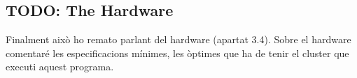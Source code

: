 
\subsection{TODO: The Hardware}

Finalment això ho remato parlant del hardware (apartat 3.4). Sobre el hardware
comentaré les especificacions mínimes, les òptimes que ha de tenir el cluster
que executi aquest programa.
